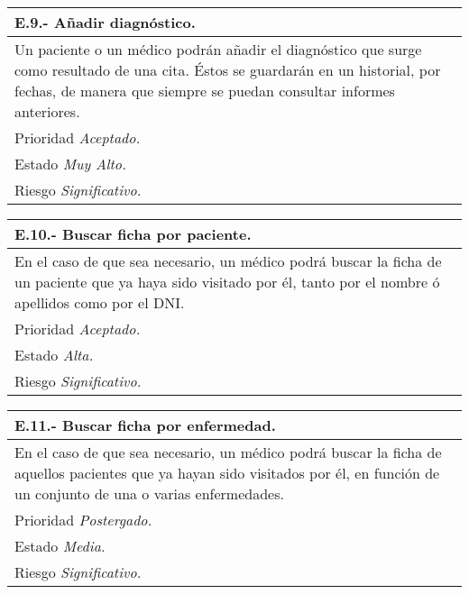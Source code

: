 \documentclass[a4paper,oneside,11pt]{book}
\begin{document}
\begin{center}
\begin{tabulary}{15cm}{|L|}
	\hline
		\bf{E.9.- Añadir diagnóstico.} \\
	\hline
		Un paciente o un médico podrán añadir el diagnóstico que surge como resultado de una cita. Éstos se guardarán en un historial, por fechas, de manera que siempre se puedan consultar informes anteriores. \\
	\hline
		Prioridad \textit{Aceptado.} \\
	\hline
		Estado \textit{Muy Alto.} \\
	\hline
		Riesgo \textit{Significativo.} \\
	\hline
\end{tabulary}
\end{center}

\begin{center}
\begin{tabulary}{15cm}{|L|}
	\hline
		\bf{E.10.- Buscar ficha por paciente.} \\
	\hline
		En el caso de que sea necesario, un médico podrá buscar la ficha de un paciente que ya haya sido visitado por él, tanto por el nombre ó apellidos como por el DNI. \\
	\hline
		Prioridad \textit{Aceptado.} \\
	\hline
		Estado \textit{Alta.} \\
	\hline
		Riesgo \textit{Significativo.} \\
	\hline
\end{tabulary}
\end{center}

\begin{center}
\begin{tabulary}{15cm}{|L|}
	\hline
		\bf{E.11.- Buscar ficha por enfermedad.} \\
	\hline
		En el caso de que sea necesario, un médico podrá buscar la ficha de aquellos pacientes que ya hayan sido visitados por él, en función de un conjunto de una o varias enfermedades. \\
	\hline
		Prioridad \textit{Postergado.} \\
	\hline
		Estado \textit{Media.} \\
	\hline
		Riesgo \textit{Significativo.} \\
	\hline
\end{tabulary}
\end{center}
\end{document}
